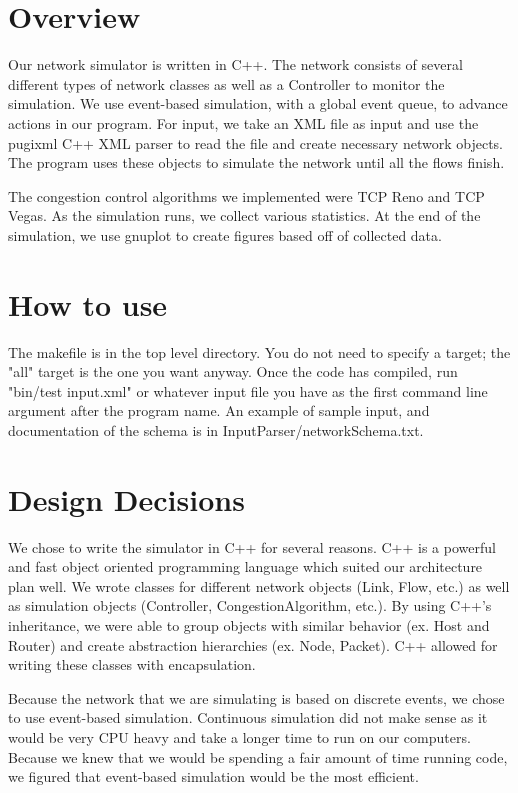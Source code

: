 \documentclass{article}
\begin{document}
\section{Overview}

Our network simulator is written in C++. The network consists of several different types of network classes as well as a Controller to monitor the simulation. We use event-based simulation, with a global event queue, to advance actions in our program. For input, we take an XML file as input and use the pugixml C++ XML parser to read the file and create necessary network objects. The program uses these objects to simulate the network until all the flows finish. 

The congestion control algorithms we implemented were TCP Reno and TCP Vegas. As the simulation runs, we collect various statistics. At the end of the simulation, we use gnuplot to create figures based off of collected data.


\section{How to use}

The makefile is in the top level directory. You do not need to specify a target; the "all" target is the one you want anyway. Once the code has compiled, run "bin/test input.xml" or whatever input file you have as the first command line argument after the program name. An example of sample input, and documentation of the schema is in InputParser/networkSchema.txt.

\section{Design Decisions}
	
	We chose to write the simulator in C++ for several reasons. C++ is a powerful and fast object oriented programming language which suited our architecture plan well. We wrote classes for different network objects (Link, Flow, etc.) as well as simulation objects (Controller, CongestionAlgorithm, etc.). By using C++’s inheritance, we were able to group objects with similar behavior (ex. Host and Router) and create abstraction hierarchies (ex. Node, Packet).  C++ allowed for writing these classes with encapsulation.

    Because the network that we are simulating is based on discrete events, we chose to use event-based simulation. Continuous simulation did not make sense as it would be very CPU heavy and take a longer time to run on our computers. Because we knew that we would be spending a fair amount of time running code, we figured that event-based simulation would be the most efficient.
\end{document}
